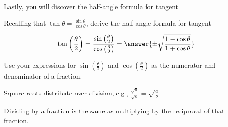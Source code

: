 \documentclass[numbers]{ximera}
\begin{document}
Lastly, you will discover the half-angle formula for tangent.

\begin{question}
Recalling that $\tan\theta=\frac{\sin\theta}{\cos\theta}$, derive the half-angle formula for tangent:

\[\tan\left(\frac{\theta}{2}\right) = \frac{\sin\left(\frac{\theta}{2}\right)}{\cos\left(\frac{\theta}{2}\right)} = \answer{\pm\sqrt{\frac{1-\cos\theta}{1+\cos\theta}}}\]
\begin{hint} Use your expressions for $\sin\left(\frac{\theta}{2}\right)$ and $\cos\left(\frac{\theta}{2}\right)$ as the numerator and denominator of a fraction. \end{hint}
\begin{hint} Square roots distribute over division, e.g., $\frac{\sqrt{a}}{\sqrt{b}}=\sqrt{\frac{a}{b}}$ \end{hint}
\begin{hint} Dividing by a fraction is the same as multiplying by the reciprocal of that fraction. \end{hint}
\end{question}
\vfill
\end{document}
